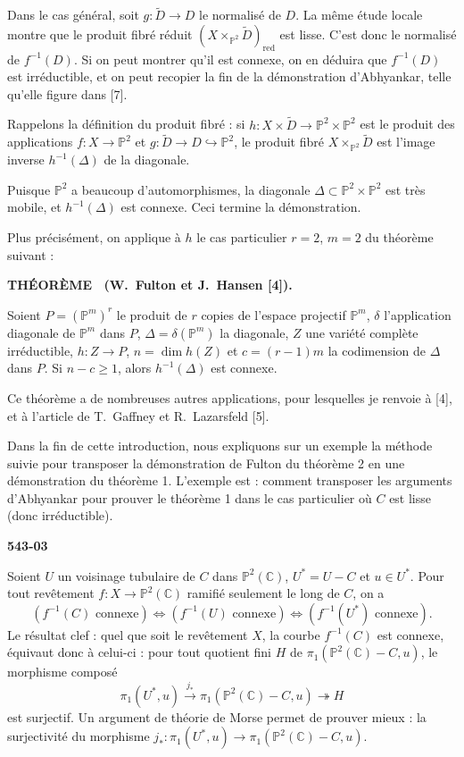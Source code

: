 \documentclass[12pt,a4paper]{article}
\newcounter{mainthm}
\newenvironment{maintheorem}[1][]{%
  \refstepcounter{mainthm}%
  \par\medskip\noindent\textbf{THÉORÈME \themainthm#1.}~\ignorespaces
}{\par\medskip}
\begin{document}
Dans le cas général, soit $g : \widetilde{D} \to D$ le normalisé de $D$. La même étude locale montre que le produit fibré réduit $(X \times_{\mathbb{P}^2} \widetilde{D})_{\mathrm{red}}$ est lisse. C'est donc le normalisé de $f^{-1}(D)$. Si on peut montrer qu'il est connexe, on en déduira que $f^{-1}(D)$ est irréductible, et on peut recopier la fin de la démonstration d'Abhyankar, telle qu'elle figure dans [7].

Rappelons la définition du produit fibré : si $h : X \times \widetilde{D} \to \mathbb{P}^2 \times \mathbb{P}^2$ est le produit des applications $f : X \to \mathbb{P}^2$ et $g : \widetilde{D} \to D \hookrightarrow \mathbb{P}^2$, le produit fibré $X \times_{\mathbb{P}^2} \widetilde{D}$ est l'image inverse $h^{-1}(\Delta)$ de la diagonale.

Puisque $\mathbb{P}^2$ a beaucoup d'automorphismes, la diagonale $\Delta \subset \mathbb{P}^2 \times \mathbb{P}^2$ est très mobile, et $h^{-1}(\Delta)$ est connexe. Ceci termine la démonstration.

Plus précisément, on applique à $h$ le cas particulier $r = 2$, $m = 2$ du théorème suivant :

\begin{maintheorem}[~(W.\ Fulton et J.\ Hansen {[4]})]
Soient $P = (\mathbb{P}^m)^r$ le produit de $r$ copies de l'espace projectif $\mathbb{P}^m$, $\delta$ l'application diagonale de $\mathbb{P}^m$ dans $P$, $\Delta = \delta(\mathbb{P}^m)$ la diagonale, $Z$ une variété complète irréductible, $h : Z \to P$, $n = \dim h(Z)$ et $c = (r-1)m$ la codimension de $\Delta$ dans $P$. Si $n - c \geq 1$, alors $h^{-1}(\Delta)$ est connexe.
\end{maintheorem}

Ce théorème a de nombreuses autres applications, pour lesquelles je renvoie à [4], et à l'article de T.\ Gaffney et R.\ Lazarsfeld [5].

Dans la fin de cette introduction, nous expliquons sur un exemple la méthode suivie pour transposer la démonstration de Fulton du théorème 2 en une démonstration du théorème 1. L'exemple est : comment transposer les arguments d'Abhyankar pour prouver le théorème 1 dans le cas particulier où $C$ est lisse (donc irréductible).

\newpage
\begin{flushright}
\textbf{543-03}
\end{flushright}

Soient $U$ un voisinage tubulaire de $C$ dans $\mathbb{P}^2(\mathbb{C})$, $U^* = U - C$ et $u \in U^*$. Pour tout revêtement $f : X \to \mathbb{P}^2(\mathbb{C})$ ramifié seulement le long de $C$, on a
\[
(f^{-1}(C) \text{ connexe}) \Longleftrightarrow (f^{-1}(U) \text{ connexe}) \Longleftrightarrow (f^{-1}(U^*) \text{ connexe}).
\]
Le résultat clef : quel que soit le revêtement $X$, la courbe $f^{-1}(C)$ est connexe, équivaut donc à celui-ci : pour tout quotient fini $H$ de $\pi_1(\mathbb{P}^2(\mathbb{C}) - C, u)$, le morphisme composé
\[
\pi_1(U^*, u) \xrightarrow{j_*} \pi_1(\mathbb{P}^2(\mathbb{C}) - C, u) \twoheadrightarrow H
\]
est surjectif. Un argument de théorie de Morse permet de prouver mieux : la surjectivité du morphisme $j_* : \pi_1(U^*, u) \to \pi_1(\mathbb{P}^2(\mathbb{C}) - C, u)$.
\end{document}
